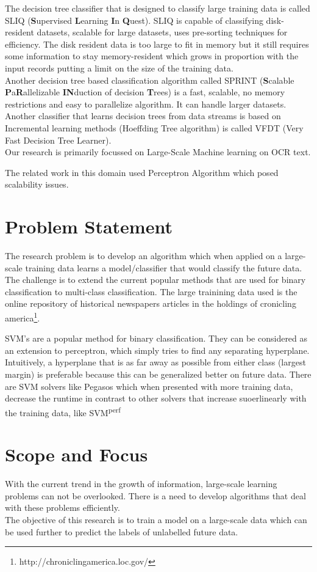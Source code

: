 \documentclass{article}
\begin{document}
The decision tree classifier that is designed to classify large training data is called SLIQ (\textbf{S}upervised \textbf{L}earning \textbf{I}n \textbf{Q}uest). SLIQ is capable of classifying disk-resident datasets, scalable for large datasets, uses pre-sorting techniques for efficiency. The disk resident data is too large to fit in memory but it still requires some information to stay memory-resident which grows in proportion with the input records putting a limit on the size of the training data.\\ Another decision tree based classification algorithm called SPRINT (\textbf{S}calable \textbf{P}a\textbf{R}allelizable \textbf{IN}duction of decision \textbf{T}rees) is a fast, scalable, no memory restrictions and easy to parallelize algorithm. It can handle larger datasets.
Another classifier that learns decision trees from data streams is based on Incremental learning methods (Hoeffding Tree algorithm) is called VFDT (Very Fast Decision Tree Learner).\\
Our research is primarily focussed on Large-Scale Machine learning on OCR text.


The related work in this domain used Perceptron Algorithm which posed scalability issues. 



\section{Problem Statement}
The research problem is to develop an algorithm which when applied on a large-scale training data learns a model/classifier that would classify the future data. The challenge is to extend the current popular methods that are used for binary classification to multi-class classification.
The large trainining data used is the online repository of historical newspapers articles in the holdings of cronicling america\footnote{http://chroniclingamerica.loc.gov/}.

SVM's are a popular method for binary classification. They can be considered as an extension to perceptron, which simply tries to find any separating hyperplane. Intuitively, a hyperplane that is as far away as possible from either class (largest margin) is preferable because this can be generalized better on future data.
There are SVM solvers like Pegasos which when presented with more training data, decrease the runtime in contrast to other solvers that increase suoerlinearly with the training data, like SVM\textsuperscript{perf}

\section{Scope and Focus}
With the current trend in the growth of information, large-scale learning problems can not be overlooked. There is a need to develop algorithms that deal with these problems efficiently.\\
The objective of this research is to train a model on a large-scale data which can be used further to predict the labels of unlabelled future data.
\end{document}

